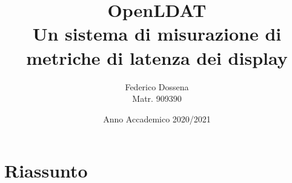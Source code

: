 \documentclass[a4paper]{article}
\title{OpenLDAT\\Un sistema di misurazione di metriche di latenza dei display}
\author{Federico Dossena\\Matr. 909390}
\date{Anno Accademico 2020/2021}
\begin{document}
\maketitle
\sloppy
\setlength{\parskip}{10pt}
\setlength{\parindent}{0pt}
\section*{Riassunto}
\lipsum[1-10]
\end{document}

